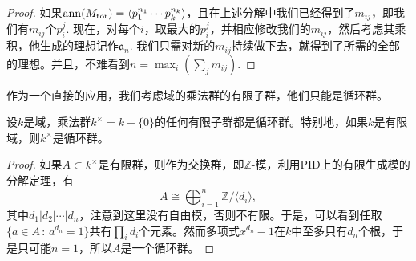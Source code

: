 \begin{proof}
    如果$\operatorname{ann}(M_{\mathrm{tor}})=\langle p_1^{n_1}\cdots p_k^{n_k}\rangle$，且在上述分解中我们已经得到了$m_{ij}$，即我们有$m_{ij}$个$p_i^j$. 现在，对每个$i$，取最大的$p_i^j$，并相应修改我们的$m_{ij}$，然后考虑其乘积，他生成的理想记作$\mathfrak{a}_n$. 我们只需对新的$m_{ij}$持续做下去，就得到了所需的全部的理想。并且，不难看到$n=\max_i(\sum_j m_{ij})$.
\end{proof}

作为一个直接的应用，我们考虑域的乘法群的有限子群，他们只能是循环群。

\begin{pro}
    设$k$是域，乘法群$k^\times = k-\{0\}$的任何有限子群都是循环群。特别地，如果$k$是有限域，则$k^\times$是循环群。
\end{pro}

\begin{proof}
    如果$A\subset k^\times$是有限群，则作为交换群，即$\mathbb Z$-模，利用PID上的有限生成模的分解定理，有
    \[
        A\cong \bigoplus_{i=1}^n \mathbb Z/\langle d_i\rangle,
    \]
    其中$d_1|d_2|\cdots|d_n$，注意到这里没有自由模，否则不有限。于是，可以看到任取$\{a\in A\,:\, a^{d_n}=1\}$共有$\prod_i d_i$个元素。然而多项式$x^{d_n}-1$在$k$中至多只有$d_n$个根，于是只可能$n=1$，所以$A$是一个循环群。
\end{proof}